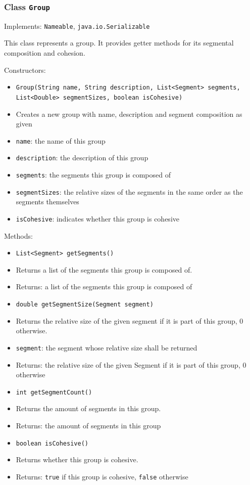 \documentclass[parskip=full,11pt]{scrartcl}
\begin{document}
\subsubsection{Class \texttt{Group}}
Implements: \texttt{Nameable}, \texttt{java.io.Serializable}

This class represents a group. It provides getter methods for its segmental composition and cohesion.

Constructors:
\begin{itemize}\itemsep -10pt
\item \texttt{Group(String name, String description, List<Segment> segments, List<Double> segmentSizes, boolean isCohesive)}
\item[] Creates a new group with name, description and segment composition as given
\item[] \texttt{name}: the name of this group
\item[] \texttt{description}: the description of this group
\item[] \texttt{segments}: the segments this group is composed of
\item[] \texttt{segmentSizes}: the relative sizes of the segments in the same order as the segments themselves
\item[] \texttt{isCohesive}: indicates whether this group is cohesive
\end{itemize}

Methods:
\begin{itemize}\itemsep -10pt
\item \texttt{List<Segment> getSegments()}
\item[] Returns a list of the segments this group is composed of.
\item[] Returns: a list of the segments this group is composed of

\item \texttt{double getSegmentSize(Segment segment)}
\item[] Returns the relative size of the given segment if it is part of this group, \(0\) otherwise.
\item[] \texttt{segment}: the segment whose relative size shall be returned
\item[] Returns: the relative size of the given Segment if it is part of this group, \(0\) otherwise

\item \texttt{int getSegmentCount()}
\item[] Returns the amount of segments in this group.
\item[] Returns: the amount of segments in this group

\item \texttt{boolean isCohesive()}
\item[] Returns whether this group is cohesive.
\item[] Returns: \texttt{true} if this group is cohesive, \texttt{false} otherwise
\end{itemize}
\end{document}
